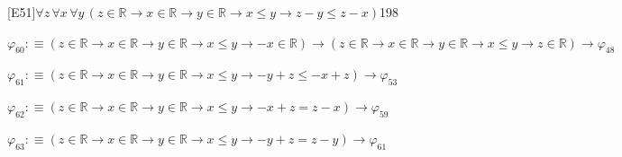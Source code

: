 \begin{fullproof}{[E51]}{$\forall z\,\forall x\,\forall y\,(z \in \mathbb{R} \to x \in \mathbb{R} \to y \in \mathbb{R} \to x \leq y \to z - y \leq z - x)$}{198}
\begin{abbrevlist}
\item $\varphi_{60} :\equiv (z \in \mathbb{R} \to x \in \mathbb{R} \to y \in \mathbb{R} \to x \leq y \to -x \in \mathbb{R}) \to (z \in \mathbb{R} \to x \in \mathbb{R} \to y \in \mathbb{R} \to x \leq y \to z \in \mathbb{R}) \to \varphi_{48}$
\item $\varphi_{61} :\equiv (z \in \mathbb{R} \to x \in \mathbb{R} \to y \in \mathbb{R} \to x \leq y \to -y + z \leq -x + z) \to \varphi_{53}$
\item $\varphi_{62} :\equiv (z \in \mathbb{R} \to x \in \mathbb{R} \to y \in \mathbb{R} \to x \leq y \to -x + z = z - x) \to \varphi_{59}$
\item $\varphi_{63} :\equiv (z \in \mathbb{R} \to x \in \mathbb{R} \to y \in \mathbb{R} \to x \leq y \to -y + z = z - y) \to \varphi_{61}$
\end{abbrevlist}
\end{fullproof}
